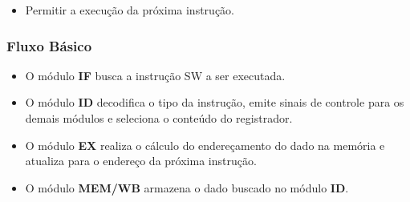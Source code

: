 \postconditions
\begin{itemize}
	\item Permitir a execução da próxima instrução.
\end{itemize}

\subsubsection*{Fluxo Básico}
\begin{itemize}
	\item O módulo \textbf{IF} busca a instrução SW a ser executada.
	\item O módulo \textbf{ID} decodifica o tipo da instrução, emite sinais de controle para os demais módulos e seleciona o conteúdo do registrador.
	\item O módulo \textbf{EX} realiza o cálculo do endereçamento do dado na memória e atualiza para o endereço da próxima instrução.
	
	\item O módulo \textbf{MEM/WB} armazena o dado buscado no módulo \textbf{ID}.
\end{itemize}